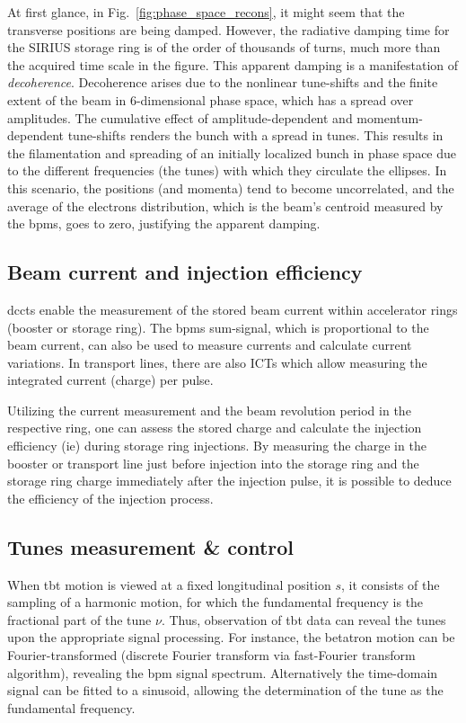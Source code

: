 At first glance, in Fig.~\ref{fig:phase_space_recons}, it might seem that the transverse positions are being damped. However, the radiative damping time for the SIRIUS storage ring is of the order of thousands of turns, much more than the acquired time scale in the figure. This apparent damping is a manifestation of \textit{decoherence}. Decoherence arises due to the nonlinear tune-shifts and the finite extent of the beam in 6-dimensional phase space, which has a spread over amplitudes. The cumulative effect of amplitude-dependent and momentum-dependent tune-shifts renders the bunch with a spread in tunes. This results in the filamentation and spreading of an initially localized bunch in phase space due to the different frequencies (the tunes) with which they circulate the ellipses. In this scenario, the positions (and momenta) tend to become uncorrelated, and the average of the electrons distribution, which is the beam's centroid measured by the \glspl*{bpm}, goes to zero, justifying the apparent damping.
\subsection{Beam current and injection efficiency}
\glspl*{dcct} enable the measurement of the stored beam current within accelerator rings (booster or storage ring). The \glspl*{bpm} sum-signal, which is proportional to the beam current, can also be used to measure currents and calculate current variations. In transport lines, there are also \glspl*{ICT} which allow measuring the integrated current (charge) per pulse.

Utilizing the current measurement and the beam revolution period in the respective ring, one can assess the stored charge and calculate the injection efficiency (\gls*{ie}) during storage ring injections. By measuring the charge in the booster or transport line just before injection into the storage ring and the storage ring charge immediately after the injection pulse, it is possible to deduce the efficiency of the injection process.
\subsection{Tunes measurement \& control}
When \gls*{tbt} motion is viewed at a fixed longitudinal position $s$, it consists of the sampling of a harmonic motion, for which the fundamental frequency is the fractional part of the tune $\nu$. Thus, observation of \gls*{tbt} data can reveal the tunes upon the appropriate signal processing. For instance, the betatron motion can be Fourier-transformed (discrete Fourier transform via fast-Fourier transform algorithm), revealing the \gls*{bpm} signal spectrum. Alternatively the time-domain signal can be fitted to a sinusoid, allowing the determination of the tune as the fundamental frequency.

